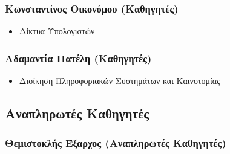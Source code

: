 \documentclass[
]{article}
\begin{document}
\hypertarget{ux3baux3c9ux3bdux3c3ux3c4ux3b1ux3bdux3c4ux3afux3bdux3bfux3c2-ux3bfux3b9ux3baux3bfux3bdux3ccux3bcux3bfux3c5-ux3baux3b1ux3b8ux3b7ux3b3ux3b7ux3c4ux3adux3c2}{%
\subsubsection{Κωνσταντίνος Οικονόμου
(Καθηγητές)}\label{ux3baux3c9ux3bdux3c3ux3c4ux3b1ux3bdux3c4ux3afux3bdux3bfux3c2-ux3bfux3b9ux3baux3bfux3bdux3ccux3bcux3bfux3c5-ux3baux3b1ux3b8ux3b7ux3b3ux3b7ux3c4ux3adux3c2}}

\begin{itemize}
\item
  Δίκτυα Υπολογιστών
\end{itemize}

\hypertarget{ux3b1ux3b4ux3b1ux3bcux3b1ux3bdux3c4ux3afux3b1-ux3c0ux3b1ux3c4ux3adux3bbux3b7-ux3baux3b1ux3b8ux3b7ux3b3ux3b7ux3c4ux3adux3c2}{%
\subsubsection{Αδαμαντία Πατέλη
(Καθηγητές)}\label{ux3b1ux3b4ux3b1ux3bcux3b1ux3bdux3c4ux3afux3b1-ux3c0ux3b1ux3c4ux3adux3bbux3b7-ux3baux3b1ux3b8ux3b7ux3b3ux3b7ux3c4ux3adux3c2}}

\begin{itemize}
\item
  Διοίκηση Πληροφοριακών Συστημάτων και Καινοτομίας
\end{itemize}

\hypertarget{ux3b1ux3bdux3b1ux3c0ux3bbux3b7ux3c1ux3c9ux3c4ux3adux3c2-ux3baux3b1ux3b8ux3b7ux3b3ux3b7ux3c4ux3adux3c2}{%
\subsection{Αναπληρωτές
Καθηγητές}\label{ux3b1ux3bdux3b1ux3c0ux3bbux3b7ux3c1ux3c9ux3c4ux3adux3c2-ux3baux3b1ux3b8ux3b7ux3b3ux3b7ux3c4ux3adux3c2}}

\hypertarget{ux3b8ux3b5ux3bcux3b9ux3c3ux3c4ux3bfux3baux3bbux3aeux3c2-ux3adux3beux3b1ux3c1ux3c7ux3bfux3c2-ux3b1ux3bdux3b1ux3c0ux3bbux3b7ux3c1ux3c9ux3c4ux3adux3c2-ux3baux3b1ux3b8ux3b7ux3b3ux3b7ux3c4ux3adux3c2}{%
\subsubsection{Θεμιστοκλής Έξαρχος (Αναπληρωτές
Καθηγητές)}\label{ux3b8ux3b5ux3bcux3b9ux3c3ux3c4ux3bfux3baux3bbux3aeux3c2-ux3adux3beux3b1ux3c1ux3c7ux3bfux3c2-ux3b1ux3bdux3b1ux3c0ux3bbux3b7ux3c1ux3c9ux3c4ux3adux3c2-ux3baux3b1ux3b8ux3b7ux3b3ux3b7ux3c4ux3adux3c2}}
\end{document}
